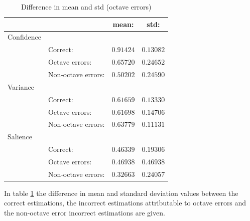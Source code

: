 \documentclass{proc}
\begin{document}
\begin{table}[h]
    \begin{center}
        \begin{tabular}{ | l | l | c | c |}
            \hline
                        &                   &   mean:       &   std:        \\ \hline
            Confidence  &                   &               &               \\  \hline
                        &Correct:           &   $0.91424$   &   $0.13082$   \\  \hline
                        &Octave errors:     &   $0.65720$   &   $0.24652$   \\  \hline
                        &Non-octave errors: &   $0.50202$   &   $0.24590$   \\  \hline
            \hline
            Variance   &                    &               &               \\  \hline
                        &Correct:           &   $0.61659$   &   $0.13330$   \\  \hline
                        &Octave errors:     &   $0.61698$   &   $0.14706$   \\  \hline
                        &Non-octave errors: &   $0.63779$   &   $0.11131$   \\  \hline
 
           Salience   &                     &               &               \\  \hline
                        &Correct:           &   $0.46339$   &   $0.19306$   \\  \hline
                        &Octave errors:     &   $0.46938$   &   $0.46938$   \\  \hline
                        &Non-octave errors: &   $0.32663$   &   $0.24057$   \\  \hline
        \end{tabular}
        \caption{Difference in mean and std (octave errors)}
        \label{table:msdiffOct_cvs}
    \end{center}
\end{table}
In table \ref{table:msdiffOct_cvs} the difference in mean and standard deviation values between the correct estimations, the incorrect estimations attributable to octave errors and the non-octave error incorrect estimations are given. 
\end{document}
